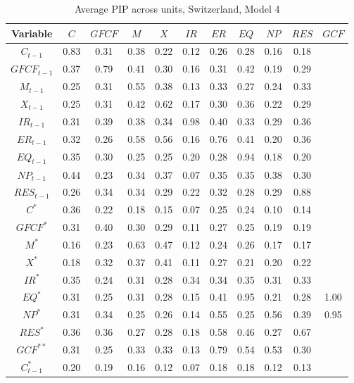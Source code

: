 \documentclass[a4paper, twoside]{templates/ociamthesis}
\begin{document}
\begin{table}[!ht]

\caption{\label{tab:Table55CH4}Average PIP across units, Switzerland, Model 4}
\centering
\fontsize{6}{8}\selectfont
\begin{tabular}[t]{ccccccccccc}
\toprule
Variable & $C$ & $GFCF$ & $M$ & $X$ & $IR$ & $ER$ & $EQ$ & $NP$ & $RES$ & $GCF$\\
\midrule
$C_{t-1}$ & 0.83 & 0.31 & 0.38 & 0.22 & 0.12 & 0.26 & 0.28 & 0.16 & 0.18 & \\
$GFCF_{t-1}$ & 0.37 & 0.79 & 0.41 & 0.30 & 0.16 & 0.31 & 0.42 & 0.19 & 0.29 & \\
$M_{t-1}$ & 0.25 & 0.31 & 0.55 & 0.38 & 0.13 & 0.33 & 0.27 & 0.24 & 0.33 & \\
$X_{t-1}$ & 0.25 & 0.31 & 0.42 & 0.62 & 0.17 & 0.30 & 0.36 & 0.22 & 0.29 & \\
$IR_{t-1}$ & 0.31 & 0.39 & 0.38 & 0.34 & 0.98 & 0.40 & 0.33 & 0.29 & 0.36 & \\
$ER_{t-1}$ & 0.32 & 0.26 & 0.58 & 0.56 & 0.16 & 0.76 & 0.41 & 0.20 & 0.36 & \\
$EQ_{t-1}$ & 0.35 & 0.30 & 0.25 & 0.25 & 0.20 & 0.28 & 0.94 & 0.18 & 0.20 & \\
$NP_{t-1}$ & 0.44 & 0.23 & 0.34 & 0.37 & 0.07 & 0.35 & 0.35 & 0.38 & 0.30 & \\
$RES_{t-1}$ & 0.26 & 0.34 & 0.34 & 0.29 & 0.22 & 0.32 & 0.28 & 0.29 & 0.88 & \\
$C^*$ & 0.36 & 0.22 & 0.18 & 0.15 & 0.07 & 0.25 & 0.24 & 0.10 & 0.14 & \\
$GFCF^*$ & 0.31 & 0.40 & 0.30 & 0.29 & 0.11 & 0.27 & 0.25 & 0.19 & 0.19 & \\
$M^*$ & 0.16 & 0.23 & 0.63 & 0.47 & 0.12 & 0.24 & 0.26 & 0.17 & 0.17 & \\
$X^*$ & 0.18 & 0.32 & 0.37 & 0.41 & 0.11 & 0.27 & 0.21 & 0.20 & 0.22 & \\
$IR^*$ & 0.35 & 0.24 & 0.31 & 0.28 & 0.34 & 0.34 & 0.35 & 0.31 & 0.33 & \\
$EQ^*$ & 0.31 & 0.25 & 0.31 & 0.28 & 0.15 & 0.41 & 0.95 & 0.21 & 0.28 & 1.00\\
$NP^*$ & 0.31 & 0.34 & 0.25 & 0.26 & 0.14 & 0.55 & 0.25 & 0.56 & 0.39 & 0.95\\
$RES^*$ & 0.36 & 0.36 & 0.27 & 0.28 & 0.18 & 0.58 & 0.46 & 0.27 & 0.67 & \\
$GCF^{**}$ & 0.31 & 0.25 & 0.33 & 0.33 & 0.13 & 0.79 & 0.54 & 0.53 & 0.30 & \\
$C^*_{t-1}$ & 0.20 & 0.19 & 0.16 & 0.12 & 0.07 & 0.18 & 0.18 & 0.12 & 0.13 & \\

\end{tabular}
\end{table}
\end{document}
